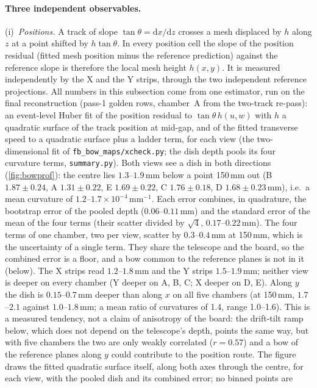 \paragraph{Three independent observables.}
(i)~\emph{Positions.} A track of slope $\tan\theta = \mathrm{d}x/\mathrm{d}z$ crosses a mesh displaced by $h$ along $z$
at a point shifted by $h\tan\theta$. In every position cell the slope of the position residual (fitted mesh position
minus the reference prediction) against the reference slope is therefore the local mesh height $h(x,y)$. It is measured independently
by the X and the Y strips, through the two independent reference projections. All numbers in this subsection come from one
estimator, run on the final reconstruction (pass-1 golden rows, chamber~A from the two-track re-pass): an event-level Huber fit of
the position residual to $\tan\theta\,h(u,w)$ with $h$ a quadratic surface of the track position at mid-gap, and of the fitted
transverse speed to a quadratic surface plus a ladder term, for each view (the two-dimensional fit of
\texttt{fb\_bow\_maps/xcheck.py}; the dish depth pools its four curvature terms, \texttt{summary.py}). Both views see a dish in both directions
(\cref{fig:bowprof}): the centre lies $1.3$--$1.9$\,mm below a point 150\,mm out
(B $1.87\pm0.24$, A $1.31\pm0.22$, E $1.69\pm0.22$, C $1.76\pm0.18$, D $1.68\pm0.23$\,mm), i.e.\ a mean curvature of
$1.2$--$1.7\times10^{-4}$\,mm$^{-1}$. Each error combines, in quadrature, the bootstrap error of the pooled depth ($0.06$--$0.11$\,mm)
and the standard error of the mean of the four terms (their scatter divided by $\sqrt4$, $0.17$--$0.22$\,mm). The four terms of one chamber, two
per view, scatter by $0.3$--$0.4$\,mm at 150\,mm, which is the uncertainty of a single term. They share the telescope and the board, so the
combined error is a floor, and a bow common to the reference planes is not in it (below).
The X strips read $1.2$--$1.8$\,mm and the Y strips $1.5$--$1.9$\,mm; neither view is deeper on every chamber
(Y deeper on A, B, C; X deeper on D, E). Along $y$ the dish is $0.15$--$0.7$\,mm deeper than along $x$ on all five chambers
(at 150\,mm, $1.7$--$2.1$ against $1.0$--$1.8$\,mm; a mean ratio of curvatures of 1.4, range 1.0--1.6). This is a measured tendency, not a claim of
anisotropy of the board: the drift-tilt ramp below, which does not depend on the telescope's depth, points the same way, but with five chambers
the two are only weakly correlated ($r=0.57$) and a bow of the reference planes along $y$ could contribute to the position route. The figure draws the
fitted quadratic surface itself, along both axes through the centre, for each view, with the pooled dish and its combined error; no binned points are
